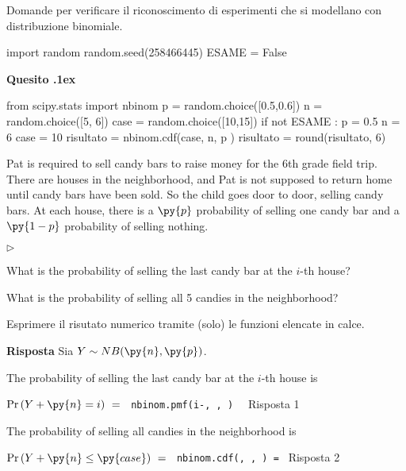 \documentclass[11pt,twoside,a4paper]{article}
\newcommand{\mylabel}[1]{#1\hfill}
\renewenvironment{itemize}
  {\begin{list}{$\triangleright$}{%
   \setlength{\parskip}{0mm}
   \setlength{\topsep}{.4\baselineskip}
   \setlength{\rightmargin}{0mm}
   \setlength{\listparindent}{0mm}
   \setlength{\itemindent}{0mm}
   \setlength{\labelwidth}{2ex}
   \setlength{\itemsep}{.4\baselineskip}
   \setlength{\parsep}{0mm}
   \setlength{\partopsep}{0mm}
   \setlength{\labelsep}{1ex}
   \setlength{\leftmargin}{\labelwidth+\labelsep}
   \let\makelabel\mylabel}}{%
   \end{list}\vspace*{-1.3mm}}
\def\Ex{{\rm E\,}}
\def\Var{{\rm Var\,}}
\newcounter{quesito}
\newenvironment{question}{\bigskip\addtocounter{quesito}{1}\bigskip\bigskip\par\textbf{Quesito \thequesito.\kern1ex}}{\vspace{\parskip}}
\newenvironment{answer}{\par\textbf{Risposta\quad}}{\vspace{\parskip}}
\begin{document}
\colorbox{blue!10}{\begin{minipage}{\textwidth}
Domande  per verificare il riconoscimento di esperimenti che si modellano con distribuzione binomiale.
\end{minipage}}

\bigskip\bigskip


\begin{pycode}
import random
random.seed(258466445)
ESAME = False
\end{pycode}



\begin{question}
\def\Pr{{\rm Pr\,}}
\def\Ex{{\rm E\,}}
\def\Var{{\rm Var\,}}
\begin{pycode}
from scipy.stats import nbinom
p = random.choice([0.5,0.6])
n = random.choice([5, 6])
case = random.choice([10,15])
if not ESAME :
   p = 0.5
   n = 6
   case = 10
risultato = nbinom.cdf(case, n, p )
risultato = round(risultato, 6)
\end{pycode}
Pat is required to sell candy bars to raise money for the 6th grade field trip. There are  houses in the neighborhood, and Pat is not supposed to return home until  candy bars have been sold. So the child goes door to door, selling candy bars. At each house, there is a $\py{p}$ probability of selling one candy bar and a $\py{1-p}$ probability of selling nothing.
\begin{itemize}
\item[1.] What is the probability of selling the last candy bar at the $i$-th house? 
\item[2.] What is the probability of selling all 5 candies in the neighborhood? 
\end{itemize}

Esprimere il risutato numerico tramite (solo) le funzioni elencate in calce. 
\begin{answer}
Sia $Y\sim NB(\py{n},\py{p})$.

The probability of selling the last candy bar at the $i$-th house is 

$\Pr(Y+\py{n}=i)\ =\ ${\tt{\color{blue}\ nbinom.pmf(i-, ,  ) } } {\color{blue}\hfill Risposta 1}

The probability of selling all  candies in the neighborhood is 

$\Pr(Y+\py{n}\le\py{case})\ =\ ${\tt{\color{blue}\ nbinom.cdf(, ,  ) }=  } {\color{blue}\hfill Risposta 2}\par
\end{answer}
\end{question}
\end{document}
